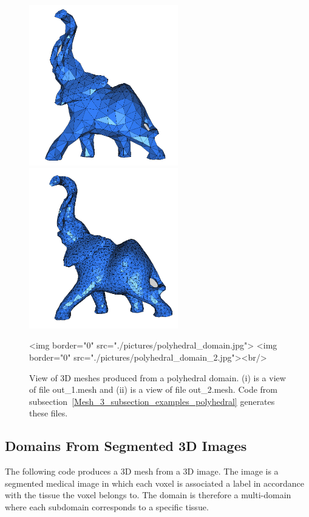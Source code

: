 
\begin{figure}[ht]
\begin{center}
 \begin{ccTexOnly}
   \includegraphics[height=7cm]{Mesh_3/pictures/polyhedral_domain}
   \includegraphics[height=7cm]{Mesh_3/pictures/polyhedral_domain_2}
 \end{ccTexOnly}
 \begin{ccHtmlOnly}
   <img border="0" src="./pictures/polyhedral_domain.jpg">
   <img border="0" src="./pictures/polyhedral_domain_2.jpg"><br/>
 \end{ccHtmlOnly}
 \caption{View of 3D meshes produced from a polyhedral domain. (i) 
   is a view of file out\_1.mesh and (ii) is a view of file
   out\_2.mesh. Code from
   subsection~\ref{Mesh_3_subsection_examples_polyhedral} generates
   these files.}
  \label{figure:polyhedral_domain}
\end{center}
\end{figure}


\subsection{Domains  From Segmented 3D Images}
\label{Mesh_3_subsection_examples_3d_image}
The following code produces  a 3D mesh from
a 3D image. The image is a segmented medical image  in which each 
voxel  is associated a label  in accordance with
the tissue  the voxel belongs to.
The domain is therefore a multi-domain
where each subdomain corresponds to a specific tissue.

